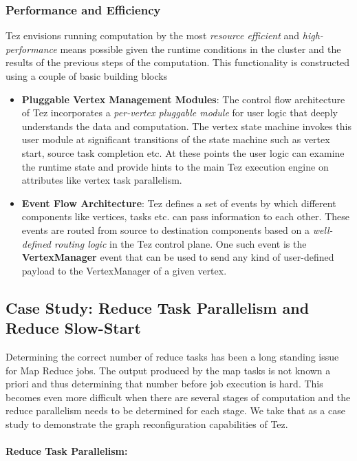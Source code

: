 \documentclass[twocolumn]{article}
\begin{document}
\subsubsection*{Performance and Efficiency} 
Tez envisions running computation by the most \emph{resource efficient}
and \emph{high-performance} means possible given the runtime conditions in the cluster and the results of the previous steps of the computation. This functionality is constructed using a couple of basic building blocks

\begin{itemize}
\item
  \textbf{Pluggable Vertex Management Modules}: The control flow
  architecture of Tez incorporates a \emph{per-vertex pluggable module}
  for user logic that deeply understands the data and computation. The
  vertex state machine invokes this user module at significant
  transitions of the state machine such as vertex start, source task
  completion etc. At these points the user logic can examine the runtime
  state and provide hints to the main Tez execution engine on attributes
  like vertex task parallelism.
\item
  \textbf{Event Flow Architecture}: Tez defines a set of events by which
  different components like vertices, tasks etc. can pass information to
  each other. These events are routed from source to destination
  components based on a \emph{well-defined routing logic} in the Tez
  control plane. One such event is the \textbf{VertexManager} event that
  can be used to send any kind of user-defined payload to the
  VertexManager of a given vertex.
\end{itemize}

\subsection{Case Study: Reduce Task Parallelism and Reduce Slow-Start}

Determining the correct number of reduce tasks has been a long standing
issue for Map Reduce jobs. The output produced by the map tasks is not
known a priori and thus determining that number before job execution is
hard. This becomes even more difficult when there are several stages of
computation and the reduce parallelism needs to be determined for each
stage. We take that as a case study to demonstrate the graph
reconfiguration capabilities of Tez.

\paragraph{Reduce Task Parallelism:}
\end{document}
